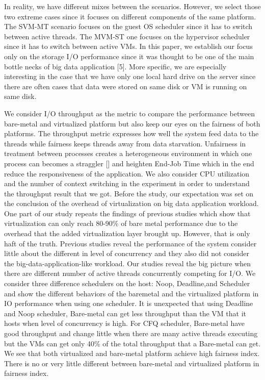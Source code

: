 \documentclass{acmsig}
\begin{document}
In reality, we have different mixes between the scenarios. However, we select those two extreme cases since it focuses on different components of the same platform. The SVM-MT scenario focuses on the guest OS scheduler since it has to switch between active threads. The MVM-ST one focuses on the hypervisor scheduler since it has to switch between active VMs.  In this paper, we establish our focus only on the storage I/O performance since it was thought to be one of the main bottle necks of big data application [5]. More specific, we are especially interesting in the case that we have only one local hard drive on the server since there are often cases that data were stored on same disk or VM is running on same disk.

We consider I/O throughput as the metric to compare the performance between bare-metal and virtualized platform but also keep our eyes on the fairness of both platforms. The throughput metric expresses how well the system feed data to the threads while fairness keeps threads away from data starvation. Unfairness in treatment between processes creates a heterogeneous environment in which one process can becomes a straggler [\cite{matei08}] and heighten End-Job Time which in the end reduce the responsiveness of the application. We also consider CPU utilization and the number of context switching in the experiment in order to understand the throughput result that we got. Before the study, our expectation was set on the conclusion of the overhead of virtualization on big data application workload. One part of our study repeats the findings of previous studies which show that virtualization can only reach 80-90\% of bare metal performance due to the overhead that the added virtualization layer brought up. However, that is only haft of the truth. Previous studies reveal the performance of the system consider little about the different in level of concurrency and they also did not consider the big-data-application-like workload. Our studies reveal the big picture when there are different number of active threads concurrently competing for I/O. We consider three difference schedulers on the host: Noop, Deadline,and Scheduler and show the different behaviors of the baremetal and the virtualized platform in IO performance when using one scheduler. It is unexpected that using Deadline and Noop scheduler, Bare-metal can get less throughput than the VM that it hosts when level of concurrency is high. For CFQ scheduler, Bare-metal have good throughput and change little when there are many active threads executing but the VMs can get only 40\% of the total throughput that a Bare-metal can get. We see that both virtualized and bare-metal platform achieve high fairness index. There is no or very little different between bare-metal and virtualized platform in fairness index.
\end{document}
